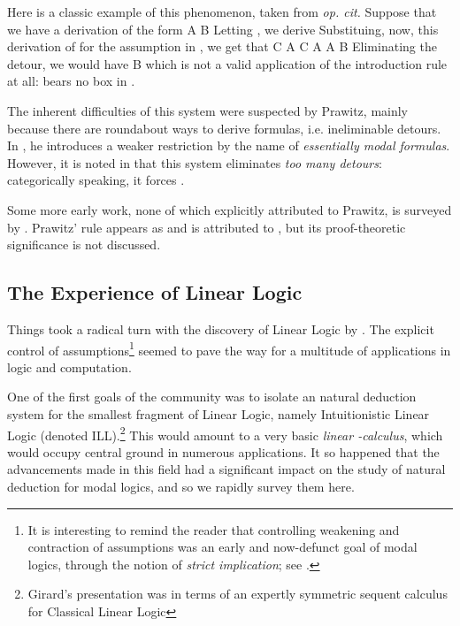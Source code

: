 \documentclass[a4paper]{amsart}
\begin{document}
Here is a classic example of this phenomenon, taken from \emph{op.
cit.} Suppose that we have a derivation of the form    \justifies \Box A \vdash B  Letting , we
derive  Substituing, now, this derivation of  for
the assumption in , we get that  \Gamma \vdash C \rightarrow \Box A
      \quad
    \Gamma \vdash C
      \justifies
    \Gamma \vdash \Box A   \leadsto 
    \justifies
  \Box A \vdash \Box B  Eliminating the detour, we would have   \justifies \Gamma \vdash B  which is not a valid application of the
introduction rule at all:  bears no box in .

The inherent difficulties of this system were suspected by Prawitz,
mainly because there are roundabout ways to derive formulas, i.e.
ineliminable detours. In \citep[\S VI.2]{Prawitz1965}, he
introduces a weaker restriction by the name of \emph{essentially modal
formulas}. However, it is noted in \citep[\S 8]{Bierman2000a} that
this system eliminates \emph{too many detours}: categorically
speaking, it forces .

Some more early work, none of which explicitly attributed to
Prawitz, is surveyed by \cite{Satre1972}. Prawitz' rule appears as
 and is attributed to \cite{Ohnisi1957, Ohnisi1959}, but
its proof-theoretic significance is not discussed.

\subsection{The Experience of Linear Logic}

Things took a radical turn with the discovery of Linear Logic by
\cite{Girard1987}. The explicit control of assumptions\footnote{It
is interesting to remind the reader that controlling weakening and
contraction of assumptions was an early and now-defunct goal of
modal logics, through the notion of \emph{strict implication}; see
\citep[\S II.2]{Girard1987}.} seemed to pave the way for a
multitude of applications in logic and computation.

One of the first goals of the community was to isolate an
natural deduction system for the smallest fragment of Linear
Logic, namely Intuitionistic Linear Logic (denoted
\textsf{ILL}).\footnote{Girard's presentation was in terms of an
expertly symmetric sequent calculus for Classical Linear Logic}
This would amount to a very basic \emph{linear
-calculus}, which would occupy central ground in numerous
applications. It so happened that the advancements made in this
field had a significant impact on the study of natural deduction
for modal logics, and so we rapidly survey them here.
\end{document}
